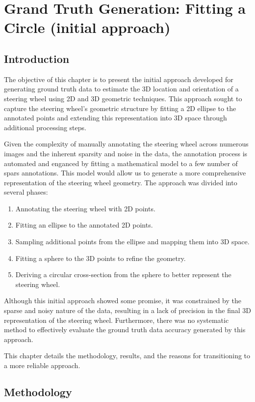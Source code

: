 \chapter{Grand Truth Generation: Fitting a Circle (initial approach)}

\section{Introduction}
The objective of this chapter is to present the initial 
approach developed for generating ground truth data to 
estimate the 3D location and orientation of a steering wheel 
using 2D and 3D geometric techniques. This approach sought 
to capture the steering wheel’s geometric structure by 
fitting a 2D ellipse to the annotated points and extending this 
representation into 3D space through additional processing 
steps.


Given the complexity of manually annotating the steering wheel 
across numerous images and the inherent sparsity and noise in 
the data, the annotation process is automated and enganced by fitting a mathematical model to a few number of 
spars annotations. This model would allow us to generate a 
more comprehensive representation of the steering wheel 
geometry.
The approach was divided into several phases:
\begin{enumerate}
    \item Annotating the steering wheel with 2D points.
    \item Fitting an ellipse to the annotated 2D points.
    \item Sampling additional points from the ellipse and mapping them into 3D space.
    \item Fitting a sphere to the 3D points to refine the geometry.
    \item Deriving a circular cross-section from the sphere to better represent the steering wheel.
\end{enumerate}

Although this initial approach showed some promise, it was 
constrained by the sparse and noisy nature of the data, 
resulting in a lack of precision in the final 3D representation 
of the steering wheel. Furthermore, there was no systematic 
method to effectively evaluate the ground truth data accuracy 
generated by this approach.

This chapter details the methodology, results, and the reasons 
for transitioning to a more reliable approach.


\section{Methodology}

